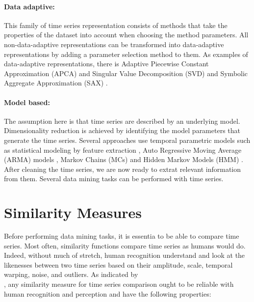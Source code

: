 \paragraph{Data adaptive:} This family of time series representation  consists of methods that take the properties of the dataset into account when choosing the method parameters. All non-data-adaptive representations can be transformed into data-adaptive representations by adding a parameter selection method to them. As examples of data-adaptive representations, there is Adaptive Piecewise Constant Approximation (APCA) \cite{keogh2001locally} and Singular Value Decomposition (SVD) \cite{de1994singular} and Symbolic Aggregate Approximation (SAX) \cite{lin2003symbolic}.

\paragraph{Model based:} The assumption here is that time series are described by an underlying model.  Dimensionality reduction is achieved by identifying the model parameters that generate the time series. Several approaches use temporal parametric models such as statistical modeling by feature extraction \cite{Esling2012}, Auto Regressive Moving Average (ARMA) models \cite{kalpakis2001distance}, Markov Chains (MCs) and Hidden Markov Models (HMM) \cite{panuccio2002hidden}.
\\

After cleaning the time series, we are now ready to extrat relevant information from them. Several data mining tasks can be performed with time series.

\section{Similarity Measures}

Before performing data mining tasks, it is essentia to be able to compare time series. Most often,  similarity functions compare time series as humans would do. Indeed, without much of stretch, human recognition understand and look at the likenesses between two time series based on their amplitude, scale, temporal warping, noise, and outliers. As indicated by \cite{fu2011review} \\ \cite{ralanamahatana2005mining}  \cite{Esling2012}, any similarity measure  for time series comparison ought to be reliable with human recognition and perception and have the following properties:


